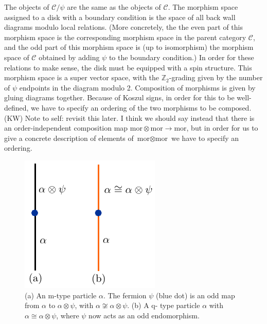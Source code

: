 \documentclass[12pt,a4paper]{article}
\newcommand{\tp}{\otimes}
\newcommand{\mcc}{\mathcal{C}}
\newcommand{\zt}{\mathbb{Z}_2}
\newcommand{\mor}{\text{mor}}
\newcommand{\kw}[1]{{\color{kwcolor}\footnotesize{(KW) #1}}}
\begin{document}
The objects of $\mcc/\psi$ are the same as the objects of $\mcc$.
The morphism space assigned to a disk with a boundary condition is the space of all back wall diagrams
modulo local relations.
(More concretely, the the even part of this morphism space is the corresponding morphism space in the parent category $\mcc$,
and the odd part of this morphism space is (up to isomorphism) the morphism space of $\mcc$ 
obtained by adding $\psi$ to the boundary condition.)
In order for these relations to make sense, the disk must be equipped with a spin structure.
This morphism space is a super vector space, with the $\zt$-grading given by the number of $\psi$ endpoints in the diagram modulo 2.
Composition of morphisms is given by gluing diagrams together.
Because of Koszul signs, in order for this to be well-defined, 
we have to specify an ordering of the two morphisms to be composed.
\kw{Note to self: revisit this later.
I think we should say instead that there is an order-independent composition map $\mor\tp\mor\to\mor$, but in order
for us to give a concrete description of elements of $\mor\tp\mor$ we have to specify an ordering.}

\medskip

\begin{figure}
\begin{center}
\includegraphics{mvsqtype.pdf}
\caption{ \label{mvsqtype} (a) An m-type particle $\alpha$. The fermion $\psi$ (blue dot) is 
an odd map from $\alpha$ to $\alpha\tp \psi$, with $\alpha\not\cong\alpha\tp\psi$. (b) A q-
type particle $\alpha$ with $\alpha\cong\alpha\tp\psi$, where $\psi$ now acts as an odd 
endomorphism.}
\end{center}
\end{figure} 
\end{document}
